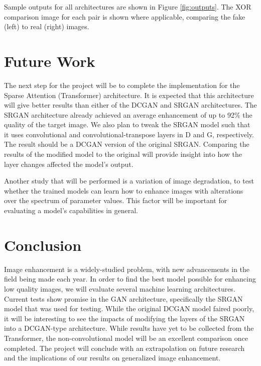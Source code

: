 \documentclass[letterpaper]{article} %
\begin{document}
Sample outputs for all architectures are shown in Figure \ref{fig:outputs}.
The XOR comparison image for each pair is shown where applicable,
comparing the fake (left) to real (right) images.

\section{Future Work}
The next step for the project will be to complete the implementation for the
Sparse Attention (Transformer) architecture. It is expected that this architecture
will give better results than either of the DCGAN and SRGAN architectures.
The SRGAN architecture already achieved an average enhancement of up to 92\%
the quality of the target image.
We also plan to tweak the SRGAN model such that it uses
convolutional and convolutional-transpose layers in D and G, respectively.
The result should be a DCGAN version of the original SRGAN.
Comparing the results of the modified model to the original will provide
insight into how the layer changes affected the model's output.

Another study that will be performed is a variation of image degradation,
to test whether the trained models can learn how to enhance images with alterations
over the spectrum of parameter values.
This factor will be important for evaluating a model's
capabilities in general.

\section{Conclusion}
Image enhancement is a widely-studied problem, with new advancements in the field
being made each year.
In order to find the best model possible for enhancing low quality images,
we will evaluate several machine learning architectures.
Current tests show promise in the GAN architecture,
specifically the SRGAN model that was used for testing.
While the original DCGAN model faired poorly, it will be interesting to see the
impacts of modifying the layers of the SRGAN into a DCGAN-type architecture.
While results have yet to be collected from the Transformer,
the non-convolutional model will be an excellent comparison once completed.
The project will conclude with an extrapolation on future research
and the implications of our results on generalized image enhancement.
\end{document}
